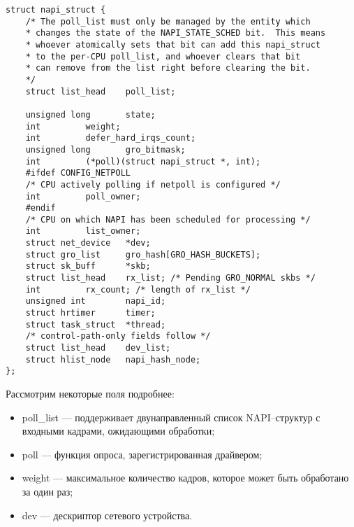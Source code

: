 \begin{center}
	\captionsetup{justification=raggedright,singlelinecheck=off}
	\begin{lstlisting}[label=lst:napi_struct,caption=Структура napi\_struct,showstringspaces=false]
struct napi_struct {
	/* The poll_list must only be managed by the entity which
	* changes the state of the NAPI_STATE_SCHED bit.  This means
	* whoever atomically sets that bit can add this napi_struct
	* to the per-CPU poll_list, and whoever clears that bit
	* can remove from the list right before clearing the bit.
	*/
	struct list_head	poll_list;
	
	unsigned long		state;
	int			weight;
	int			defer_hard_irqs_count;
	unsigned long		gro_bitmask;
	int			(*poll)(struct napi_struct *, int);
	#ifdef CONFIG_NETPOLL
	/* CPU actively polling if netpoll is configured */
	int			poll_owner;
	#endif
	/* CPU on which NAPI has been scheduled for processing */
	int			list_owner;
	struct net_device	*dev;
	struct gro_list		gro_hash[GRO_HASH_BUCKETS];
	struct sk_buff		*skb;
	struct list_head	rx_list; /* Pending GRO_NORMAL skbs */
	int			rx_count; /* length of rx_list */
	unsigned int		napi_id;
	struct hrtimer		timer;
	struct task_struct	*thread;
	/* control-path-only fields follow */
	struct list_head	dev_list;
	struct hlist_node	napi_hash_node;
};
	\end{lstlisting}
\end{center}
\FloatBarrier

Рассмотрим некоторые поля подробнее:
\begin{itemize}[label=---]
	\item poll\_list --- поддерживает двунаправленный список NAPI--структур с входными кадрами, ожидающими обработки;
	\item poll --- функция опроса, зарегистрированная драйвером; 
	\item weight --- максимальное количество кадров, которое может быть обработано за один раз;
	\item dev --- дескриптор сетевого устройства.
\end{itemize}

